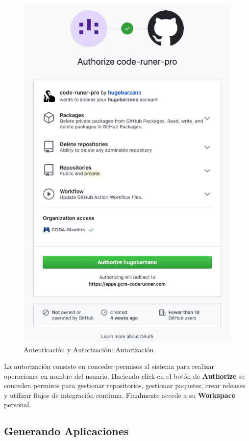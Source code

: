 \documentclass[a4paper,11pt]{book}
\begin{document}
\begin{figure}[H]
\centering
\includegraphics[scale=0.45]{imagenes/casouso_a/3.png}
\caption{  Autenticación y Autorización: Autorización }
\label{3}
\end{figure}

La autorización consiste en conceder permisos al sistema para realizar operaciones en nombre del usuario. Haciendo click en el botón de \textbf{Authorize} se conceden permisos para gestionar repositorios, gestionar paquetes, crear releases y utilizar flujos de integración continua. Finalmente accede a su \textbf{Workspace} personal. 

\subsection{Generando Aplicaciones}
\end{document}
